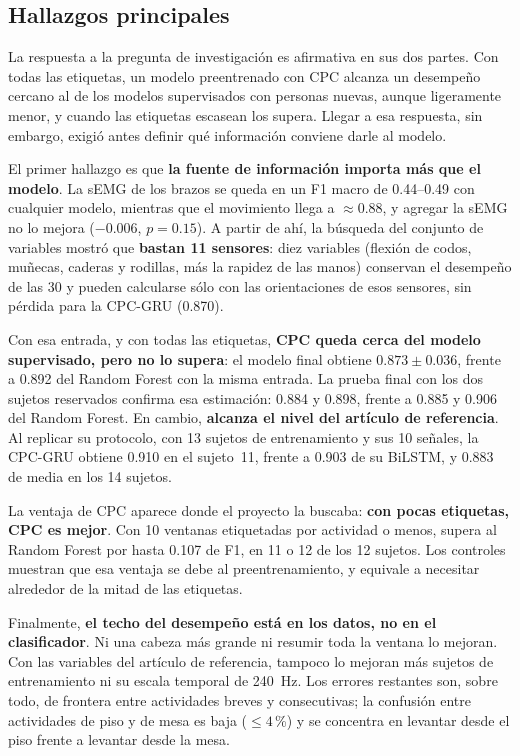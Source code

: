 \documentclass[letterpaper,11pt]{article}
\begin{document}
\subsection{Hallazgos principales}
La respuesta a la pregunta de investigación es afirmativa en sus dos partes. Con todas las etiquetas, un modelo preentrenado con CPC alcanza un desempeño cercano al de los modelos supervisados con personas nuevas, aunque ligeramente menor, y cuando las etiquetas escasean los supera. Llegar a esa respuesta, sin embargo, exigió antes definir qué información conviene darle al modelo.

El primer hallazgo es que \textbf{la fuente de información importa más que el modelo}. La sEMG de los brazos se queda en un F1 macro de 0.44--0.49 con cualquier modelo, mientras que el movimiento llega a $\approx 0.88$, y agregar la sEMG no lo mejora ($-0.006$, $p = 0.15$). A partir de ahí, la búsqueda del conjunto de variables mostró que \textbf{bastan 11 sensores}: diez variables (flexión de codos, muñecas, caderas y rodillas, más la rapidez de las manos) conservan el desempeño de las 30 y pueden calcularse sólo con las orientaciones de esos sensores, sin pérdida para la CPC-GRU (0.870).

Con esa entrada, y con todas las etiquetas, \textbf{CPC queda cerca del modelo supervisado, pero no lo supera}: el modelo final obtiene $0.873 \pm 0.036$, frente a 0.892 del Random Forest con la misma entrada. La prueba final con los dos sujetos reservados confirma esa estimación: 0.884 y 0.898, frente a 0.885 y 0.906 del Random Forest. En cambio, \textbf{alcanza el nivel del artículo de referencia}. Al replicar su protocolo, con 13 sujetos de entrenamiento y sus 10 señales, la CPC-GRU obtiene 0.910 en el sujeto~11, frente a 0.903 de su BiLSTM, y 0.883 de media en los 14 sujetos.

La ventaja de CPC aparece donde el proyecto la buscaba: \textbf{con pocas etiquetas, CPC es mejor}. Con 10 ventanas etiquetadas por actividad o menos, supera al Random Forest por hasta 0.107 de F1, en 11 o 12 de los 12 sujetos. Los controles muestran que esa ventaja se debe al preentrenamiento, y equivale a necesitar alrededor de la mitad de las etiquetas.

Finalmente, \textbf{el techo del desempeño está en los datos, no en el clasificador}. Ni una cabeza más grande ni resumir toda la ventana lo mejoran. Con las variables del artículo de referencia, tampoco lo mejoran más sujetos de entrenamiento ni su escala temporal de 240~Hz. Los errores restantes son, sobre todo, de frontera entre actividades breves y consecutivas; la confusión entre actividades de piso y de mesa es baja ($\le 4$\,\%) y se concentra en levantar desde el piso frente a levantar desde la mesa.
\end{document}

